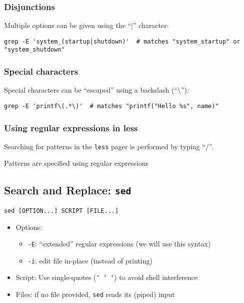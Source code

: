 \documentclass[12pt]{article}
\begin{document}
\subsubsection{Disjunctions}

Multiple options can be given using the ``|'' character:

\begin{verbatim}
grep -E 'system_(startup|shutdown)'  # matches "system_startup" or "system_shutdown"
\end{verbatim}

\subsubsection{Special characters}

Special characters can be “escaped” using a backslash (“\textbackslash”):

\begin{verbatim}
grep -E 'printf\(.*\)'  # matches "printf("Hello %s", name)"
\end{verbatim}

\subsubsection{Using regular expressions in less}

Searching for patterns in the \texttt{less} pager is performed by typing ``/''. 

Patterns are specified using regular expressions

\subsection{Search and Replace: \texttt{sed}}

\texttt{sed [OPTION...] SCRIPT [FILE...]}

\begin{itemize}
    \item Options:
    \begin{itemize}
        \item \texttt{-E}: ``extended'' regular expressions (we will use this syntax)
        \item \texttt{-i}: edit file in-place (instead of printing)
    \end{itemize}
    \item Script: Use single-quotes (\texttt{` ' `}) to avoid shell interference
    \item Files: if no file provided, \texttt{sed} reads its (piped) input
\end{itemize}
\end{document}

